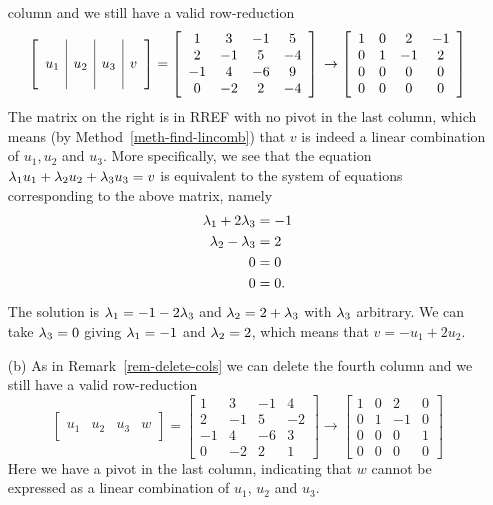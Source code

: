 \documentclass[a4paper]{amsart}
\renewenvironment{solution}{\SolutionInline}{\endSolutionInline}
\begin{document}
\begin{solution}
\begin{itemize}
   column and we still have a valid row-reduction
   \[
     \left[\begin{array}{c|c|c|c}
      &&&\\u_1&u_2&u_3&v\\ &&&
     \end{array}\right]
     =
     \left[\begin{array}{cccc}
      1&3&-1&5\\2&-1&5&-4\\-1&4&-6&9\\0&-2&2&-4
     \end{array}\right]\\
     \to
     \left[\begin{array}{cccc}
      1&0&2&-1\\0&1&-1&2\\0&0&0&0\\0&0&0&0
     \end{array}\right]
   \]
   The matrix on the right is in RREF with no pivot in the last
   column, which means (by Method~\ref{meth-find-lincomb}) that $v$ is
   indeed a linear combination of $u_1,u_2$ and $u_3$.  More
   specifically, we see that the equation
   $\lambda_1u_1+\lambda_2u_2+\lambda_3u_3=v$ is equivalent to the system of
   equations corresponding to the above matrix, namely
   \begin{align*}
    \lambda_1 + 2\lambda_3 &= -1 \\
    \lambda_2-\lambda_3 &= 2 \\
    0 &= 0 \\
    0 &= 0.
   \end{align*}
   The solution is $\lambda_1=-1-2\lambda_3$ and $\lambda_2=2+\lambda_3$ with $\lambda_3$
   arbitrary.  We can take $\lambda_3=0$ giving $\lambda_1=-1$ and $\lambda_2=2$,
   which means that $v=-u_1+2u_2$.
  \item[(b)] As in Remark~\ref{rem-delete-cols} we can delete the fourth
   column and we still have a valid row-reduction
   \[
     \left[\begin{array}{c|c|c|c}
      &&& \\ u_1&u_2&u_3&w \\ &&&
     \end{array}\right]
     =
     \left[\begin{array}{cccc}
      1&3&-1&4\\2&-1&5&-2\\-1&4&-6&3\\0&-2&2&1
     \end{array}\right]
     \to
     \left[\begin{array}{cccc}
      1&0&2&0\\0&1&-1&0\\0&0&0&1\\0&0&0&0
     \end{array}\right]
   \]
   Here we have a pivot in the last column, indicating that $w$ cannot
   be expressed as a linear combination of $u_1$, $u_2$ and $u_3$.
 \end{itemize}
\end{solution}
\end{document}
